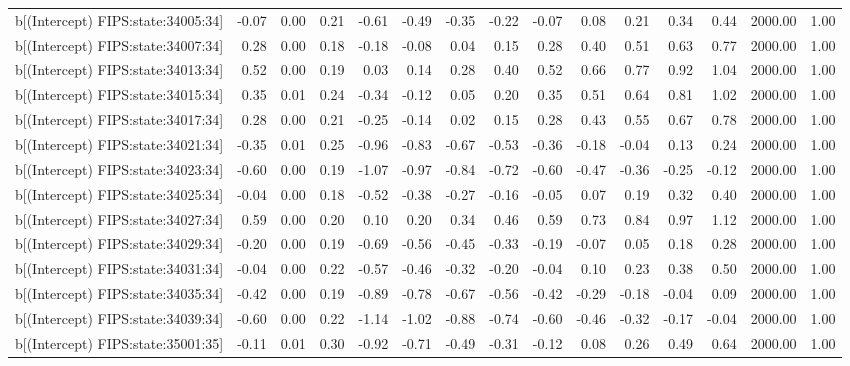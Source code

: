 \begin{table}[ht]
\begin{tabular}{rrrrrrrrrrrrrrr}
  b[(Intercept) FIPS:state:34005:34] & -0.07 & 0.00 & 0.21 & -0.61 & -0.49 & -0.35 & -0.22 & -0.07 & 0.08 & 0.21 & 0.34 & 0.44 & 2000.00 & 1.00 \\ 
  b[(Intercept) FIPS:state:34007:34] & 0.28 & 0.00 & 0.18 & -0.18 & -0.08 & 0.04 & 0.15 & 0.28 & 0.40 & 0.51 & 0.63 & 0.77 & 2000.00 & 1.00 \\ 
  b[(Intercept) FIPS:state:34013:34] & 0.52 & 0.00 & 0.19 & 0.03 & 0.14 & 0.28 & 0.40 & 0.52 & 0.66 & 0.77 & 0.92 & 1.04 & 2000.00 & 1.00 \\ 
  b[(Intercept) FIPS:state:34015:34] & 0.35 & 0.01 & 0.24 & -0.34 & -0.12 & 0.05 & 0.20 & 0.35 & 0.51 & 0.64 & 0.81 & 1.02 & 2000.00 & 1.00 \\ 
  b[(Intercept) FIPS:state:34017:34] & 0.28 & 0.00 & 0.21 & -0.25 & -0.14 & 0.02 & 0.15 & 0.28 & 0.43 & 0.55 & 0.67 & 0.78 & 2000.00 & 1.00 \\ 
  b[(Intercept) FIPS:state:34021:34] & -0.35 & 0.01 & 0.25 & -0.96 & -0.83 & -0.67 & -0.53 & -0.36 & -0.18 & -0.04 & 0.13 & 0.24 & 2000.00 & 1.00 \\ 
  b[(Intercept) FIPS:state:34023:34] & -0.60 & 0.00 & 0.19 & -1.07 & -0.97 & -0.84 & -0.72 & -0.60 & -0.47 & -0.36 & -0.25 & -0.12 & 2000.00 & 1.00 \\ 
  b[(Intercept) FIPS:state:34025:34] & -0.04 & 0.00 & 0.18 & -0.52 & -0.38 & -0.27 & -0.16 & -0.05 & 0.07 & 0.19 & 0.32 & 0.40 & 2000.00 & 1.00 \\ 
  b[(Intercept) FIPS:state:34027:34] & 0.59 & 0.00 & 0.20 & 0.10 & 0.20 & 0.34 & 0.46 & 0.59 & 0.73 & 0.84 & 0.97 & 1.12 & 2000.00 & 1.00 \\ 
  b[(Intercept) FIPS:state:34029:34] & -0.20 & 0.00 & 0.19 & -0.69 & -0.56 & -0.45 & -0.33 & -0.19 & -0.07 & 0.05 & 0.18 & 0.28 & 2000.00 & 1.00 \\ 
  b[(Intercept) FIPS:state:34031:34] & -0.04 & 0.00 & 0.22 & -0.57 & -0.46 & -0.32 & -0.20 & -0.04 & 0.10 & 0.23 & 0.38 & 0.50 & 2000.00 & 1.00 \\ 
  b[(Intercept) FIPS:state:34035:34] & -0.42 & 0.00 & 0.19 & -0.89 & -0.78 & -0.67 & -0.56 & -0.42 & -0.29 & -0.18 & -0.04 & 0.09 & 2000.00 & 1.00 \\ 
  b[(Intercept) FIPS:state:34039:34] & -0.60 & 0.00 & 0.22 & -1.14 & -1.02 & -0.88 & -0.74 & -0.60 & -0.46 & -0.32 & -0.17 & -0.04 & 2000.00 & 1.00 \\ 
  b[(Intercept) FIPS:state:35001:35] & -0.11 & 0.01 & 0.30 & -0.92 & -0.71 & -0.49 & -0.31 & -0.12 & 0.08 & 0.26 & 0.49 & 0.64 & 2000.00 & 1.00 \\ 

\end{tabular}
\end{table}
